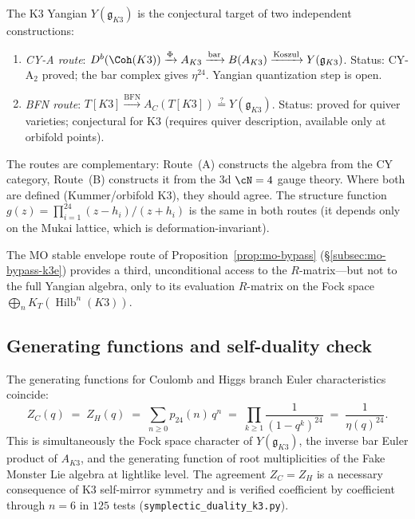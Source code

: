 \begin{remark}
\label{rem:k3e-two-routes-yangian}
The K3 Yangian $Y(\mathfrak{g}_{K3})$ is the conjectural target of two independent constructions:
\begin{enumerate}[label=\textup{(\Alph*)}]
 \item \emph{CY-A route}: $D^b(\Coh(K3)) \xrightarrow{\Phi} A_{K3} \xrightarrow{\text{bar}} B(A_{K3}) \xrightarrow{\text{Koszul}} Y(\mathfrak{g}_{K3})$.  Status: CY-A$_2$ proved; the bar complex gives $\eta^{24}$.  Yangian quantization step is open.
 \item \emph{BFN route}: $T[K3] \xrightarrow{\text{BFN}} A_C(T[K3]) \stackrel{?}{=} Y(\mathfrak{g}_{K3})$.  Status: proved for quiver varieties; conjectural for K3 (requires quiver description, available only at orbifold points).
\end{enumerate}
The routes are complementary: Route~(A) constructs the algebra from the CY category, Route~(B) constructs it from the 3d $\cN = 4$ gauge theory.  Where both are defined (Kummer/orbifold K3), they should agree.  The structure function $g(z) = \prod_{i=1}^{24} (z - h_i)/(z + h_i)$ is the same in both routes (it depends only on the Mukai lattice, which is deformation-invariant).

The MO stable envelope route of Proposition~\ref{prop:mo-bypass} (\S\ref{subsec:mo-bypass-k3e}) provides a third, unconditional access to the $R$-matrix---but not to the full Yangian algebra, only to its evaluation $R$-matrix on the Fock space $\bigoplus_n K_T(\operatorname{Hilb}^n(K3))$.
\end{remark}

\subsection{Generating functions and self-duality check}
\label{subsec:k3e-symplectic-genfunction}

\begin{proposition}
\label{prop:k3e-selfdual-fock}
\ClaimStatusProvedHere
The generating functions for Coulomb and Higgs branch Euler characteristics coincide:
\begin{equation}
\label{eq:k3e-fock-selfdual}
  Z_C(q) \;=\; Z_H(q)
  \;=\; \sum_{n \geq 0} p_{24}(n)\,q^n
  \;=\; \prod_{k \geq 1} \frac{1}{(1-q^k)^{24}}
  \;=\; \frac{1}{\eta(q)^{24}}.
\end{equation}
This is simultaneously the Fock space character of $Y(\mathfrak{g}_{K3})$, the inverse bar Euler product of $A_{K3}$, and the generating function of root multiplicities of the Fake Monster Lie algebra at lightlike level. The agreement $Z_C = Z_H$ is a necessary consequence of K3 self-mirror symmetry and is verified coefficient by coefficient through $n = 6$ in $125$ tests (\texttt{symplectic\_duality\_k3.py}).
\end{proposition}

